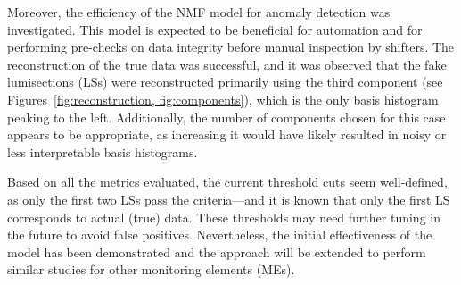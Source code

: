 Moreover, the efficiency of the NMF model for anomaly detection was investigated. This model is expected to be beneficial for automation and for performing pre-checks on data integrity before manual inspection by shifters. The reconstruction of the true data was successful, and it was observed that the fake lumisections (LSs) were reconstructed primarily using the third component (see Figures~\ref{fig:reconstruction, fig:components}), which is the only basis histogram peaking to the left. Additionally, the number of components chosen for this case appears to be appropriate, as increasing it would have likely resulted in noisy or less interpretable basis histograms.

Based on all the metrics evaluated, the current threshold cuts seem well-defined, as only the first two LSs pass the criteria—and it is known that only the first LS corresponds to actual (true) data. These thresholds may need further tuning in the future to avoid false positives. Nevertheless, the initial effectiveness of the model has been demonstrated and the approach will be extended to perform similar studies for other monitoring elements (MEs).